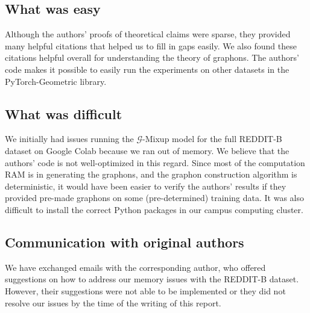 \subsection{What was easy}
Although the authors' proofs of theoretical claims were sparse, they provided many helpful citations that helped us to fill in gaps easily. We also found these citations helpful overall for understanding the theory of graphons. The authors' code makes it possible to easily run the experiments on other datasets in the PyTorch-Geometric library.

\subsection{What was difficult}\label{subsec:difficult}
We initially had issues running the $\mathcal{G}$-Mixup model for the full REDDIT-B dataset on Google Colab because we ran out of memory. We believe that the authors' code is not well-optimized in this regard. Since most of the computation RAM is in generating the graphons, and the graphon construction algorithm is deterministic, it would have been easier to verify the authors' results if they provided pre-made graphons on some (pre-determined) training data. It was also difficult to install the correct Python packages in our campus computing cluster.

\subsection{Communication with original authors}

We have exchanged emails with the corresponding author, who offered suggestions on how to address our memory issues with the REDDIT-B dataset. However, their suggestions were not able to be implemented or they did not resolve our issues by the time of the writing of this report.
